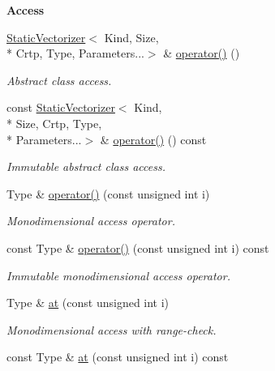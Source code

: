 \begin{Indent}{\bf Access}\par
\begin{DoxyCompactItemize}
\item 
\hyperlink{classmagrathea_1_1StaticVectorizer}{Static\-Vectorizer}$<$ Kind, Size, \\*
Crtp, Type, Parameters...$>$ \& \hyperlink{classmagrathea_1_1StaticVectorizer_a59fb69180969b012a7ba11981fb9aaf5}{operator()} ()
\begin{DoxyCompactList}\small\item\em Abstract class access. \end{DoxyCompactList}\item 
const \hyperlink{classmagrathea_1_1StaticVectorizer}{Static\-Vectorizer}$<$ Kind, \\*
Size, Crtp, Type, \\*
Parameters...$>$ \& \hyperlink{classmagrathea_1_1StaticVectorizer_a21f4f22f100057ebca8f881a6cea2fe0}{operator()} () const 
\begin{DoxyCompactList}\small\item\em Immutable abstract class access. \end{DoxyCompactList}\item 
Type \& \hyperlink{classmagrathea_1_1StaticVectorizer_a791203245d6c45ee22165b4a0bc11647}{operator()} (const unsigned int i)
\begin{DoxyCompactList}\small\item\em Monodimensional access operator. \end{DoxyCompactList}\item 
const Type \& \hyperlink{classmagrathea_1_1StaticVectorizer_aeb3ee03be09afd4621c18d49918c8d0e}{operator()} (const unsigned int i) const 
\begin{DoxyCompactList}\small\item\em Immutable monodimensional access operator. \end{DoxyCompactList}\item 
Type \& \hyperlink{classmagrathea_1_1StaticVectorizer_a842eaff610697adbed8b6bb4e403a39f}{at} (const unsigned int i)
\begin{DoxyCompactList}\small\item\em Monodimensional access with range-\/check. \end{DoxyCompactList}\item 
const Type \& \hyperlink{classmagrathea_1_1StaticVectorizer_a293da0f31f6a8db5efb9c9ebb7ff3a81}{at} (const unsigned int i) const 

\end{DoxyCompactItemize}
\end{Indent}
